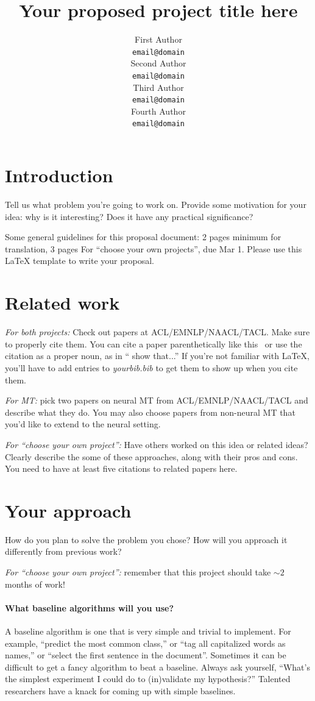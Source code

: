 \documentclass[11pt,a4paper]{article}
\title{Your proposed project title here}
\author{First Author \\
  {\tt email@domain} \\\And
  Second Author \\
  {\tt email@domain} \\\And
  Third Author \\
  {\tt email@domain} \\\And
  Fourth Author \\
  {\tt email@domain} \\}
\date{}
\begin{document}
\maketitle

\section{Introduction}
Tell us what problem you're going to work on. Provide some motivation for your idea: why is it interesting? Does it have any practical significance? 

Some general guidelines for this proposal document: 2 pages minimum for translation, 3 pages For ``choose your own projects'', due Mar 1. Please use this LaTeX template to write your proposal.

\section{Related work}

\noindent\textit{For both projects:} 
Check out papers at ACL/EMNLP/NAACL/TACL. Make sure to properly cite them. You can cite a paper parenthetically like this~\cite{andrew2007scalable} or use the citation as a proper noun, as in `` show that...'' If you're not familiar with LaTeX, you'll have to add entries to \emph{yourbib.bib} to get them to show up when you cite them. 

\noindent\textit{For MT:} pick two papers on neural MT from ACL/EMNLP/NAACL/TACL and describe what they do. You may also choose papers from non-neural MT that you'd like to  extend to the neural setting.

\noindent\textit{For ``choose your own project'':}
Have others worked on this idea or related ideas? Clearly describe the some of these approaches, along with their pros and cons. You need to have at least five citations to related papers here. 

\section{Your approach}
How do you plan to solve the problem you chose? How will you approach it differently from previous work?

\noindent\textit{For ``choose your own project'':} remember that this project should take $\sim 2$ months of work! 

\paragraph{What baseline algorithms will you use?}
A baseline algorithm is one that is very simple and trivial to implement. For example, ``predict the most common class,'' or ``tag all capitalized words as names,'' or ``select the first sentence in the document''. Sometimes it can be difficult to get a fancy algorithm to beat a baseline. Always ask yourself, ``What's the simplest experiment I could do to (in)validate my hypothesis?'' Talented researchers have a knack for coming up with simple baselines.
\end{document}

